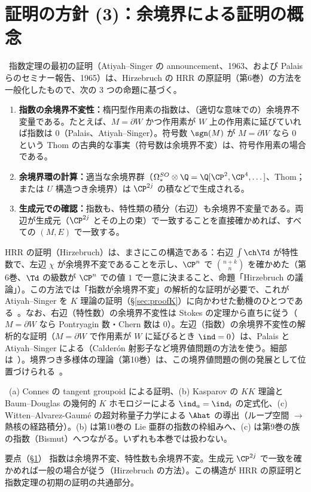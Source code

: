 \section{証明の方針 (3)：余境界による証明の概念}\label{sec:cobordism}
\tC\ 指数定理の最初の証明（Atiyah--Singer の announcement、1963、および Palais らのセミナー報告、1965）は、Hirzebruch の HRR の原証明（第6巻）の方法を一般化したもので、次の 3 つの命題に基づく。
\begin{enumerate}
\item \textbf{指数の余境界不変性：}楕円型作用素の指数は、（適切な意味での）余境界不変量である。たとえば、$M=\partial W$ かつ作用素が $W$ 上の作用素に延びていれば指数は $0$（Palais、Atiyah--Singer）。符号数 $\sgn(M)$ が $M=\partial W$ なら $0$ という Thom の古典的な事実（符号数は余境界不変）は、符号作用素の場合である。
\item \textbf{余境界環の計算：}適当な余境界群（$\Omega_*^{SO}\otimes\Q=\Q[\CP^2,\CP^4,\dots]$、Thom；または $U$ 構造つき余境界）は $\CP^{2j}$ の積などで生成される。
\item \textbf{生成元での確認：}指数も、特性類の積分（右辺）も余境界不変量である。両辺が生成元（$\CP^{2j}$ とその上の束）で一致することを直接確かめれば、すべての $(M,E)$ で一致する。
\end{enumerate}
HRR の証明（Hirzebruch）は、まさにこの構造である：右辺 $\int\ch\Td$ が特性数で、左辺 $\chi$ が余境界不変であることを示し、$\CP^n$ で $\binom{n+k}n$ を確かめた（第6巻、$\Td$ の級数が $\CP^n$ での値 $1$ で一意に決まること、命題「Hirzebruch の議論」）。この方法では「指数が余境界不変」の解析的な証明が必要で、これが Atiyah--Singer を $K$ 理論の証明（\S\ref{sec:proofK}）に向かわせた動機のひとつである\tQ\ 。なお、右辺（特性数）の余境界不変性は Stokes の定理から直ちに従う（$M=\partial W$ なら Pontryagin 数・Chern 数は $0$）。左辺（指数）の余境界不変性の解析的な証明（$M=\partial W$ で作用素が $W$ に延びるとき $\ind=0$）は、Palais と Atiyah--Singer による（Calderón 射影子など境界値問題の方法を使う。細部は\tQ\ ）。境界つき多様体の理論（第10巻）は、この境界値問題の側の発展として位置づけられる\tQ\ 。
\begin{rem}[他の証明]\label{rem:otherproofs}\tC\
(a) Connes の tangent groupoid による証明、(b) Kasparov の $KK$ 理論と Baum--Douglas の幾何的 $K$ ホモロジーによる $\ind_a=\ind_t$ の定式化、(c) Witten--Alvarez-Gaumé の超対称量子力学による $\Ahat$ の導出（ループ空間 $\to$ 熱核の経路積分）。(b) は第10巻の Lie 亜群の指数の枠組みへ、(c) は第9巻の族の指数（Bismut）へつながる。いずれも本巻では扱わない。
\end{rem}
\begin{keybox}{要点（\S\ref{sec:cobordism}）}
指数は余境界不変、特性数も余境界不変。生成元 $\CP^{2j}$ で一致を確かめれば一般の場合が従う（Hirzebruch の方法）。この構造が HRR の原証明と指数定理の初期の証明の共通部分。
\end{keybox}
